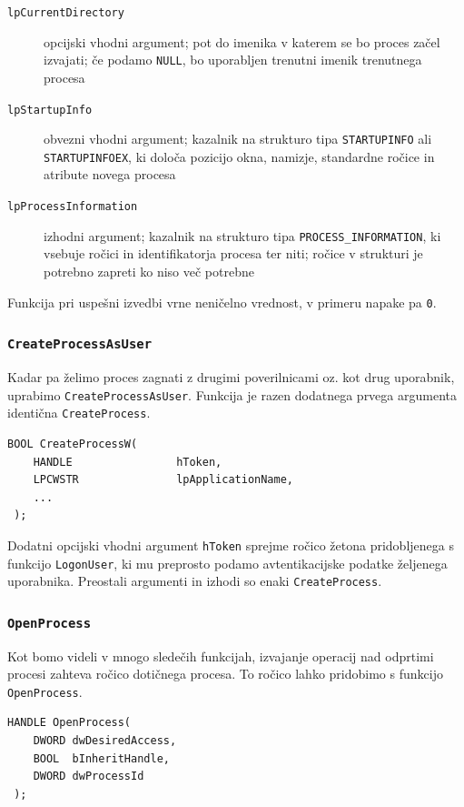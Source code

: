 \documentclass[a4paper,12pt,openright]{book}
\begin{document}
\begin{description}
	\item[\texttt{lpCurrentDirectory}] opcijski vhodni argument; pot do imenika v katerem se bo proces začel izvajati; če podamo \texttt{NULL}, bo uporabljen trenutni imenik trenutnega procesa
	\item[\texttt{lpStartupInfo}] obvezni vhodni argument; kazalnik na strukturo tipa \texttt{STARTUPINFO} ali \texttt{STARTUPINFOEX}, ki določa pozicijo okna, namizje, standardne ročice in atribute novega procesa
	\item[\texttt{lpProcessInformation}] izhodni argument; kazalnik na strukturo tipa \texttt{PROCESS\_INFORMATION}, ki vsebuje ročici in identifikatorja procesa ter niti; ročice v strukturi je potrebno zapreti ko niso več potrebne
\end{description}

Funkcija pri uspešni izvedbi vrne neničelno vrednost, v primeru napake pa \texttt{0}.

\subsubsection{\texttt{CreateProcessAsUser}}

Kadar pa želimo proces zagnati z drugimi poverilnicami oz. kot drug uporabnik, uprabimo \texttt{CreateProcessAsUser}.
Funkcija je razen dodatnega prvega argumenta identična \texttt{CreateProcess}.

\begin{lstlisting}[style=func]
 BOOL CreateProcessW(
	HANDLE                hToken,   
	LPCWSTR               lpApplicationName,
	...
 );
\end{lstlisting}

Dodatni opcijski vhodni argument \texttt{hToken} sprejme ročico žetona pridobljenega s funkcijo \texttt{LogonUser}, ki mu preprosto podamo avtentikacijske podatke željenega uporabnika.
Preostali argumenti in izhodi so enaki \texttt{CreateProcess}.

\subsubsection{\texttt{OpenProcess}}

Kot bomo videli v mnogo sledečih funkcijah, izvajanje operacij nad odprtimi procesi zahteva ročico dotičnega procesa.
To ročico lahko pridobimo s funkcijo \texttt{OpenProcess}.

\begin{lstlisting}[style=func]
 HANDLE OpenProcess(
	DWORD dwDesiredAccess,
	BOOL  bInheritHandle,
	DWORD dwProcessId
 );
\end{lstlisting}
\end{document}

